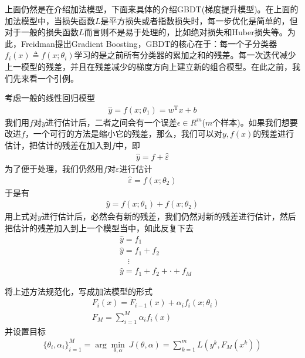           \par
          上面仍然是在介绍加法模型，下面来具体的介绍GBDT(梯度提升模型)。在上面的加法模型中，当损失函数$L$是平方损失或者指数损失时，每一步优化是简单的，但对于一般的损失函数$L$而言则不是易于处理的，比如绝对损失和Huber损失等。为此，Freidman提出Gradient Boosting\cite{2000.Frie}，GBDT的核心在于：每一个子分类器$f_i(x) \triangleq f(x;\theta_i)$学习的是之前所有分类器的累加之和的残差。每一次迭代减少上一模型的残差，并且在残差减少的梯度方向上建立新的组合模型。在此之前，我们先来看一个引例。
          \par
          考虑一般的线性回归模型
          \begin{align*}
          \hat{y} = f(x;\theta_1) = w^\mathrm{T}x + b
          \end{align*}
          我们用$f$对$y$进行估计后，二者之间会有一个误差$\epsilon\in R^m$($m$个样本)。如果我们想要改进$f$，一个可行的方法是缩小它的残差，那么，我们可以对$y,f(x)$的残差进行估计，把估计的残差在加入到$f$中，即
          \begin{align*}
          \hat{y} = f+\hat{\varepsilon}
          \end{align*}
          为了便于处理，我们仍然用$f$对$\varepsilon$进行估计
          \begin{align*}
          \hat{\varepsilon} = f(x;\theta_2)
          \end{align*}
          于是有
          \begin{align*}
          \hat{y} = f(x;\theta_1)+f(x;\theta_2)
          \end{align*}
          用上式对$y$进行估计后，必然会有新的残差，我们仍然对新的残差进行估计，然后把估计的残差加入到上一个模型当中，如此反复下去
          \begin{align*}
          & \hat{y} = f_1\\
          & \hat{y} = f_1+f_2\\
          & \quad \vdots\\
          & \hat{y} = f_1+f_2+\cdot+f_M
          \end{align*}
          \par
          将上述方法规范化，写成加法模型的形式
          \begin{align*}
          & F_i(x) =F_{i-1}(x)+\alpha_if_i(x;\theta_i)\\
          & F_M = \sum_{i=1}^M \alpha_i f_i(x)
          \end{align*}
          并设置目标
          \begin{align*}
          \{\theta_i,\alpha_i\}_{i=1}^M = \arg\min_{\theta,\alpha} \ J(\theta,\alpha) = \sum_{k=1}^m L(y^k,F_M(x^k))
          \end{align*}
